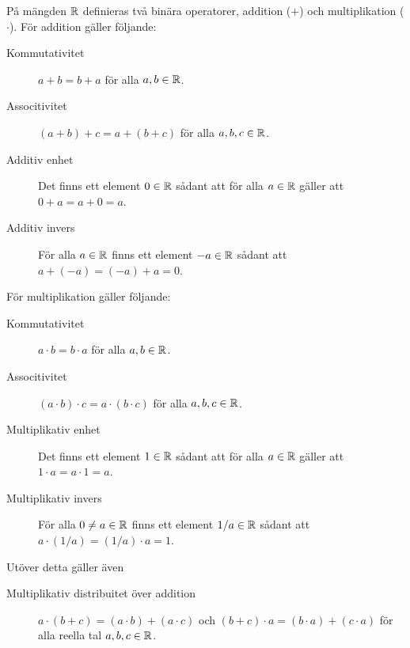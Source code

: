 \begin{definition}
  På mängden \(\mathbb{R}\) definieras två binära operatorer, addition (\(+\)) och
  multiplikation (\(\cdot\)).
  För addition gäller följande:
  \begin{description}
    \item[Kommutativitet] \(a+b=b+a\) för alla \(a,b\in\mathbb{R}\).
    \item[Associtivitet] \((a+b)+c=a+(b+c)\) för alla \(a,b,c\in\mathbb{R}\).
    \item[Additiv enhet] Det finns ett element \(0\in\mathbb{R}\) sådant att
      för alla \(a\in\mathbb{R}\) gäller att \(0+a = a+0 = a\).
    \item[Additiv invers] För alla \(a\in\mathbb{R}\) finns ett element \(-a\in\mathbb{R}\)
      sådant att \(a + (-a) = (-a) + a = 0\).
  \end{description}
  För multiplikation gäller följande:
  \begin{description}
    \item[Kommutativitet] \(a \cdot b=b \cdot a\) för alla \(a,b\in\mathbb{R}\).
    \item[Associtivitet] \((a \cdot b) \cdot c=a \cdot (b \cdot c)\) för
      alla \(a,b,c\in\mathbb{R}\).
    \item[Multiplikativ enhet] Det finns ett element \(1\in\mathbb{R}\) sådant att
      för alla \(a\in\mathbb{R}\) gäller att \(1 \cdot a = a \cdot 1 = a\).
    \item[Multiplikativ invers] För alla \(0 \neq a\in\mathbb{R}\) finns ett
      element \(1/a\in\mathbb{R}\) sådant att
      \(a \cdot (1/a) = (1/a) \cdot a = 1\).
  \end{description}
  Utöver detta gäller även
  \begin{description}
    \item[Multiplikativ distribuitet över addition]
      \(a \cdot (b+c) = (a \cdot b) + (a \cdot c)\) och
      \((b+c) \cdot a = (b \cdot a) + (c \cdot a)\) för alla reella tal
      \(a,b,c\in\mathbb{R}\).
  \end{description}
\end{definition}

